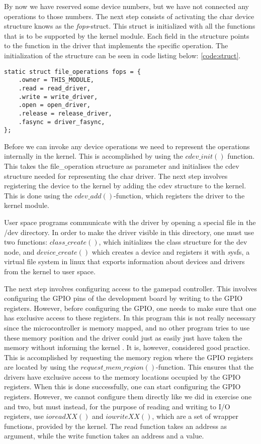 By now we have reserved some device numbers, but we have not connected any operations to those numbers. The next step consists of activating the char device structure knows as the \emph{fops}-struct. This struct is initialized with all the functions that is to be supported by the kernel module. Each field in the structure points to the function in the driver that implements the specific operation. The initialization of the structure can be seen in code listing below: \ref{code:struct}. 

\begin{lstlisting}[caption=file operations, label=code:struct]
static struct file_operations fops = {
    .owner = THIS_MODULE,
    .read = read_driver,
    .write = write_driver,
    .open = open_driver,
    .release = release_driver,
    .fasync = driver_fasync,
};
\end{lstlisting}




Before we can invoke any device operations we need to represent the operations internally in the kernel. This is accomplished by using the $cdev\_init()$ function. This takes the file\_operation structure as parameter and initialises the cdev structure needed for representing the char driver. The next step involves registering the device to the kernel by adding the cdev structure to the kernel. This is done using the $cdev\_add()$-function, which registers the driver to the kernel module. 

User space programs communicate with the driver by opening a special file in the /dev directory. In order to make the driver visible in this directory, one must use two functions: $class\_create()$, which initializes the class structure for the dev node, and $device\_create()$ which creates a device and registers it with \emph sysfs, a virtual file system in linux that exports information about devices and drivers from the kernel to user space. 

The next step involves configuring access to the gamepad controller. This involves configuring the GPIO pins of the development board by writing to the GPIO registers. However, before configuring the GPIO, one needs to make sure that one has exclusive access to these registers. In this program this is not really necessary since the microcontroller is memory mapped, and no other program tries to use these memory position and the driver could just as easily just have taken the memory without informing the kernel \cite{EFM32GG-rm}. It is, however, considered good practice. This is accomplished by requesting the memory region where the GPIO registers are located by using the  $request\_mem\_region()$-function. This ensures that the drivers have exclusive access to the memory locations occupied by the GPIO registers. When this is done successfully, one can start configuring the GPIO registers. However, we cannot configure them directly like we did in exercise one and two, but must instead, for the purpose of  reading and writing to I/O registers, use $ioreadXX()$ and $iowriteXX()$, which are a set of wrapper functions, provided by the kernel. The read function takes an address as argument, while the write function takes an address and a value. 

